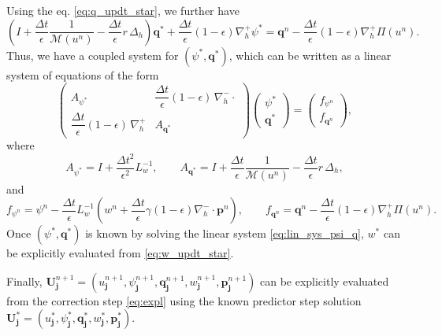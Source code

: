 \documentclass[11pt]{article}
\numberwithin{equation}{section}
\newtheorem{counter example}[theorem]{Counter Example}
\numberwithin{equation}{section}
\numberwithin{equation}{section}
\begin{document}
Using the eq. \eqref{eq:q_updt_star}, we further have
\[
\left(
I + \frac{\Delta t}{\epsilon}\dfrac{1}{\mathcal M(u^n)}
- \frac{\Delta t}{\epsilon}r\,\Delta_h
\right)\mathbf{q}^*
+
\frac{\Delta t}{\epsilon}(1-\epsilon)\nabla_h^+\psi^*
=
\mathbf{q}^n - \frac{\Delta t}{\epsilon}(1-\epsilon)\nabla_h^+ \Pi(u^n).
\]
Thus, we have a coupled system for $(\psi^*, \mathbf{q}^*)$, which can be written as a linear system of equations of the form
\begin{equation}
\label{eq:lin_sys_psi_q}
    \begin{pmatrix}
    A_{\psi^*} & \dfrac{\Delta t}{\epsilon}(1-\epsilon)\,\nabla_h^- \cdot \\
    \dfrac{\Delta t}{\epsilon}(1-\epsilon)\,\nabla_h^+ & A_{\mathbf{q}^*}
    \end{pmatrix}
    \begin{pmatrix}
    \psi^* \\
    \mathbf{q}^*
    \end{pmatrix}
    =
    \begin{pmatrix}
    f_{\psi^n} \\
    f_{\mathbf{q}^n}
    \end{pmatrix},
\end{equation}
where
\begin{equation}
    A_{\psi^*} = I + \frac{\Delta t^2}{\epsilon^2} L_w^{-1},
\qquad A_{\mathbf{q}^*} = I + \frac{\Delta t}{\epsilon}\frac{1}{\mathcal{M}(u^n)} - \frac{\Delta t}{\epsilon} r\,\Delta_h,
\end{equation}
and
\begin{equation}
    f_{\psi^n} =
\psi^n
- \frac{\Delta t}{\epsilon} L_w^{-1}
\left(
w^n + \frac{\Delta t}{\epsilon}\gamma(1-\epsilon)\nabla_h^- \cdot \mathbf{p}^n
\right), \qquad f_{\mathbf{q}^n} =
 \mathbf{q}^n
- \frac{\Delta t}{\epsilon}(1-\epsilon)\nabla_h^+ \Pi(u^n).
\end{equation}
Once $(\psi^*, \mathbf{q}^*)$ is known by solving the linear system \eqref{eq:lin_sys_psi_q}, $w^*$ can be explicitly evaluated from \eqref{eq:w_updt_star}.

Finally, $\mathbf{U}_{\mathbf{j}}^{n+1}=(u_{\mathbf{j}}^{n+1},\psi_{\mathbf{j}}^{n+1},\mathbf{q}_{\mathbf{j}}^{n+1},w_{\mathbf{j}}^{n+1},\mathbf{p}_{\mathbf{j}}^{n+1})$ can be explicitly evaluated from the correction step \eqref{eq:expl} using the known predictor step solution $\mathbf{U}_{\mathbf{j}}^*=(u_{\mathbf{j}}^{*},\psi^*_{\mathbf{j}},\mathbf{q}_{\mathbf{j}}^{*},w_{\mathbf{j}}^{*},\mathbf{p}_{\mathbf{j}}^{*})$.
\end{document}
